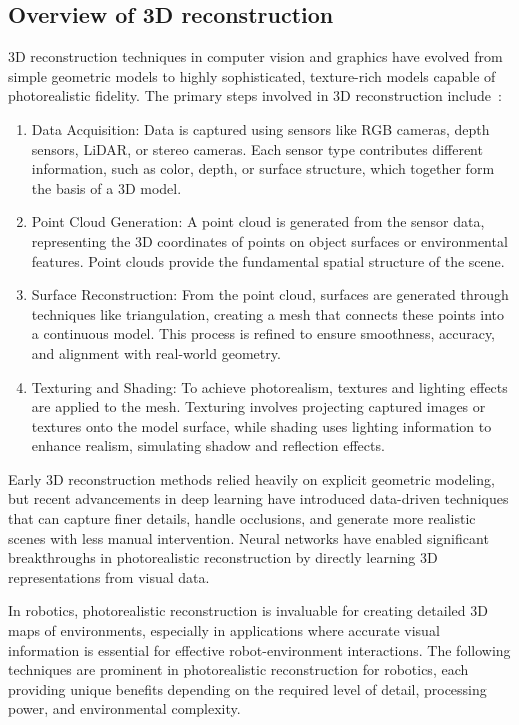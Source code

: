 \subsection{Overview of 3D reconstruction}

3D reconstruction techniques in computer vision and graphics have evolved from simple geometric models to highly sophisticated, texture-rich models capable of photorealistic fidelity. The primary steps involved in 3D reconstruction include~\cite{3d_reconstruction_steps}:
\begin{enumerate}
    \item Data Acquisition: Data is captured using sensors like RGB cameras, depth sensors, LiDAR, or stereo cameras. Each sensor type contributes different information, such as color, depth, or surface structure, which together form the basis of a 3D model.
    \item Point Cloud Generation: A point cloud is generated from the sensor data, representing the 3D coordinates of points on object surfaces or environmental features. Point clouds provide the fundamental spatial structure of the scene.
    \item Surface Reconstruction: From the point cloud, surfaces are generated through techniques like triangulation, creating a mesh that connects these points into a continuous model. This process is refined to ensure smoothness, accuracy, and alignment with real-world geometry.
    \item Texturing and Shading: To achieve photorealism, textures and lighting effects are applied to the mesh. Texturing involves projecting captured images or textures onto the model surface, while shading uses lighting information to enhance realism, simulating shadow and reflection effects.
\end{enumerate}

Early 3D reconstruction methods relied heavily on explicit geometric modeling, but recent advancements in deep learning have introduced data-driven techniques that can capture finer details, handle occlusions, and generate more realistic scenes with less manual intervention. Neural networks have enabled significant breakthroughs in photorealistic reconstruction by directly learning 3D representations from visual data.

In robotics, photorealistic reconstruction is invaluable for creating detailed 3D maps of environments, especially in applications where accurate visual information is essential for effective robot-environment interactions. The following techniques are prominent in photorealistic reconstruction for robotics, each providing unique benefits depending on the required level of detail, processing power, and environmental complexity.

